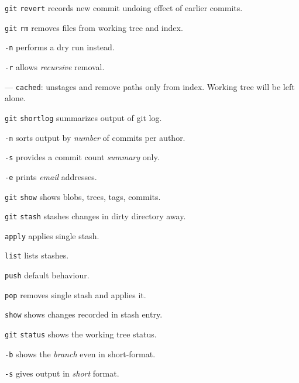 \documentclass{reference_card}
\begin{document}
\begin{multicols*}{3}
\begin{compactenum}
\item [\texttt{git}] \texttt{revert} records new commit undoing effect of earlier commits.
\end{compactenum}

\begin{compactenum}
\item [\texttt{git}] \texttt{rm} removes files from working tree and index.
\item [\texttt{-n}] performs a dry run instead.
\item [\texttt{-r}] allows \emph{recursive} removal.
\item [---] \texttt{cached}: unstages and remove paths only from index. Working tree will be left alone.
\end{compactenum}

\begin{compactenum}
\item [\texttt{git}] \texttt{shortlog} summarizes output of git log.
\item [\texttt{-n}] sorts output by \emph{number} of commits per author.
\item [\texttt{-s}] provides a commit count \emph{summary} only.
\item [\texttt{-e}] prints \emph{email} addresses.
\end{compactenum}

\begin{compactenum}
\item [\texttt{git}] \texttt{show} shows blobs, trees, tags, commits.
\end{compactenum}

\begin{compactenum}
\item [\texttt{git}] \texttt{stash} stashes changes in dirty directory away.
\item [\scriptsize \texttt{apply}] applies single stash.
\item [\scriptsize \texttt{list}] lists stashes.
\item [\scriptsize \texttt{push}] default behaviour.
\item [\scriptsize \texttt{pop}] removes single stash and applies it.
\item [\scriptsize \texttt{show}] shows changes recorded in stash entry.
\end{compactenum}

\begin{compactenum}
\item [\texttt{git}] \texttt{status} shows the working tree status.
\item [\texttt{-b}] shows the \emph{branch} even in short-format.
\item [\texttt{-s}] gives output in \emph{short} format.
\end{compactenum}


\end{multicols*}
\end{document}
